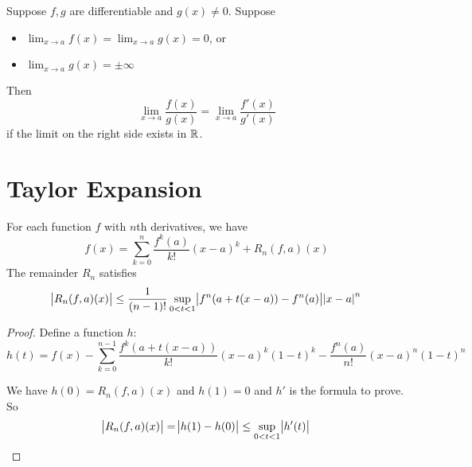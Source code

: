 \begin{theorem}\label{hospital_rule}
    Suppose $f,g$ are differentiable and $g(x) \neq 0$. Suppose
    \begin{itemize}
        \item $\displaystyle \lim_{x\rightarrow a} f(x) = \lim_{x\rightarrow a} g(x) = 0$, or
        \item $\displaystyle \lim_{x\rightarrow a} g(x) = \pm \infty$
    \end{itemize}
    Then
    \begin{equation}
        \lim_{x\rightarrow a}\frac{f(x)}{g(x)} = \lim_{x\rightarrow a}\frac{f'(x)}{g'(x)}
    \end{equation}
    if the limit on the right side exists in $\mathbb{R}$.
\end{theorem}





\section{Taylor Expansion}

\begin{theorem}
    For each function $f$ with $n$th derivatives, we have
    \begin{equation}
        f(x) = \sum_{k=0}^n \frac{f^k (a)}{k!}(x-a)^k + R_n(f,a)(x)
    \end{equation}
    The remainder $R_n$ satisfies
    \begin{equation}
        \abs{R_n(f,a)(x)} \leq \frac{1}{(n-1)!} \sup_{0 < t < 1}\abs{f^n (a + t(x-a)) - f^n (a)} \abs{x-a}^n
    \end{equation}
\end{theorem}
\begin{proof}
    Define a function $h$:
    \begin{equation}
        h(t) = f(x) - \sum_{k=0}^{n-1}\frac{f^k (a + t(x-a))}{k!} (x-a)^k (1-t)^k - \frac{f^n(a)}{n!}(x-a)^n (1-t)^n
    \end{equation}
    
    We have $h(0) = R_n(f,a)(x)$ and $h(1)=0$ and $h'$ is the formula to prove. So
    \begin{equation}
        \abs{R_n(f,a)(x)} = \abs{h(1) - h(0)} \leq \sup_{0 < t < 1} \abs{h'(t)}
    \end{equation}
\end{proof}

